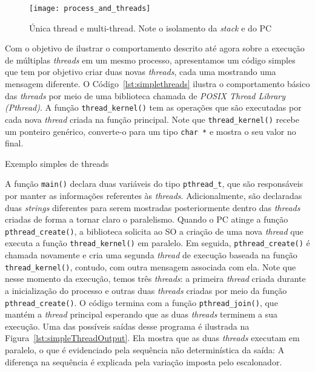 \begin{figure}[!h]
  \centering
  \texttt{[image: process\_and\_threads]}
  \caption{Única thread e multi-thread. Note o isolamento da \emph{stack} e do PC~\citep{silberschatz}}
  \label{fig:single_thread_multi_thread}
\end{figure}

Com o objetivo de ilustrar o comportamento descrito até agora sobre a execução
de múltiplas \emph{threads} em um mesmo processo, apresentamos um código
simples que tem por objetivo criar duas novas \emph{threads}, cada uma mostrando
uma mensagem diferente. O Código~\ref{lst:simplethreads} ilustra o
comportamento básico das \emph{threads} por meio de uma biblioteca chamada de
\emph{POSIX Thread Library (Pthread)}. A função
\texttt{thread\_kernel()} tem as operações que são executadas por cada nova
\emph{thread} criada na função principal. Note que \texttt{thread\_kernel()}
recebe um ponteiro genérico, converte-o para um tipo \texttt{char *} e
mostra o seu valor no final.

\begin{ruledcaption}{Exemplo simples de threads\label{lst:simplethreads}}

\end{ruledcaption}

A função \texttt{main()} declara duas variáveis do tipo \texttt{pthread\_t},
que são responsáveis por manter as informações referentes às \emph{threads}.
Adicionalmente, são declaradas duas \emph{strings} diferentes para serem
mostradas posteriormente dentro das \emph{threads} criadas de forma a
tornar claro o paralelismo. Quando o PC atinge a função
\texttt{pthread\_create()}, a biblioteca solicita ao SO a criação de uma nova
\emph{thread} que executa a função \texttt{thread\_kernel()} em paralelo. Em
seguida, \texttt{pthread\_create()} é chamada novamente e cria uma segunda
\emph{thread} de execução baseada na função \texttt{thread\_kernel()}, contudo,
com outra mensagem associada com ela. Note que nesse momento da execução, temos
três \emph{threads}: a primeira \emph{thread} criada durante a inicialização do
processo e outras duas \emph{threads} criadas por meio da função
\texttt{pthread\_create()}. O código termina com a função
\texttt{pthread\_join()}, que mantém a \emph{thread} principal esperando que as
duas \emph{threads} terminem a sua execução. Uma das possíveis saídas desse
programa é ilustrada na Figura~\ref{lst:simpleThreadOutput}. Ela mostra que as
duas \emph{threads} executam em paralelo, o que é evidenciado pela sequência não
determinística da saída: A diferença na sequência é explicada pela variação
imposta pelo escalonador.

